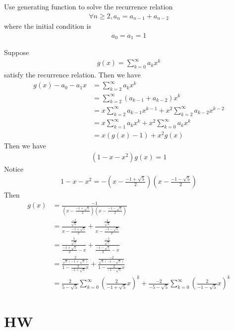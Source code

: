 \documentclass{report}
\begin{document}
\begin{question}{}{}
Use generating function to solve the recurrence relation 
 \begin{align*}
\forall n\geq 2,a_n=a_{n-1}+a_{n-2}
\end{align*}
where the initial condition is 
\begin{align*}
a_0=a_1=1
\end{align*}
\end{question}
Suppose 
\begin{align*}
g(x)=\sum_{k=0}^\infty a_kx^k
\end{align*}
satisfy the recurrence relation. Then we have 
\begin{align*}
g(x)-a_0-a_1x&=\sum_{k=2}^\infty a_kx^k\\
&=\sum_{k=2}^\infty (a_{k-1}+a_{k-2})x^k\\
&=x\sum_{k=2}^\infty a_{k-1}x^{k-1}+x^2\sum_{k=2}^\infty a_{k-2}x^{k-2}\\
&=x\sum_{k=1}^\infty a_kx^k+x^2 \sum_{k=0}^\infty a_kx^k\\
&=x(g(x)-1)+x^2g(x)
\end{align*}
Then we have 
\begin{align*}
  (1-x-x^2)g(x)=1
\end{align*}
Notice
\begin{align*}
  1-x-x^2=-(x-\frac{-1+\sqrt{5} }{2})(x-\frac{-1-\sqrt{5} }{2})
\end{align*}
Then 
\begin{align*}
g(x)&=\frac{-1}{(x-\frac{-1+\sqrt{5} }{2})(x-\frac{-1-\sqrt{5} }{2})}\\
&=\frac{\frac{-1}{\sqrt{5} }}{x-\frac{-1+\sqrt{5} }{2}}+\frac{\frac{1}{\sqrt{5} }}{x-\frac{-1-\sqrt{5} }{2}}\\
&=\frac{\frac{1}{\sqrt{5}}}{\frac{-1+\sqrt{5} }{2}-x}+\frac{\frac{-1}{\sqrt{5} }}{\frac{-1-\sqrt{5} }{2}-x}\\
&=\frac{\frac{2}{\sqrt{5}(-1+\sqrt{5} ) }}{1-\frac{2}{-1+\sqrt{5} }x}+\frac{\frac{-2}{\sqrt{5}(-1-\sqrt{5} ) }}{1-\frac{2}{-1-\sqrt{5} }x}\\
&=\frac{2}{5-\sqrt{5} } \sum_{k=0}^\infty (\frac{2}{-1+\sqrt{5} }x)^k+\frac{-2}{-5-\sqrt{5} }\sum_{k=0}^\infty (\frac{2}{-1-\sqrt{5} }x)^k
\end{align*}
\chapter{HW}
\end{document}

